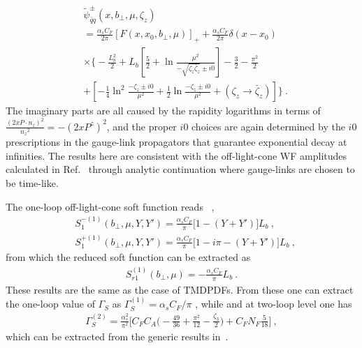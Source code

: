 \documentclass[twocolumn,superscriptaddress,longbibliography,10pt]{revtex4-1}
\begin{document}
\begin{align}\label{eq:quasiWF1oop}
&\widetilde \psi^{\pm}_{\bar q q}(x,b_\perp, \mu,\zeta_z) \\&
=\frac{\alpha_s C_F}{2\pi}\left[F(x,x_0,b_\perp,\mu)\right]_{+}+\frac{\alpha_s C_F}{2\pi}\delta\left(x-x_0\right)\nonumber \\
&\times \Bigg\{-\frac{L_b^2}{2}+L_b\left[\frac{5}{2}+\ln \frac{\mu^2}{-\sqrt{\zeta_z \bar \zeta_z} \pm i0}\right]-\frac{3}{2}-\frac{\pi^2}{2} \nonumber \\
& +\left[-\frac{1}{4}\ln^2\frac{-\zeta_z\pm i0}{\mu^2}+\frac{1}{2}\ln \frac{-\zeta_z\pm i0}{\mu^2}+(\zeta_z \rightarrow \bar \zeta_z)\right]\Bigg\}\ . \nonumber
\end{align}
The imaginary parts are all caused by the rapidity logarithms in terms of $\frac{(2xP\cdot {n_z})^2}{{n_z}^2}=-(2xP^z)^2$, and the proper $i0$ choices are again determined by the $i0$ prescriptions in the gauge-link propagators that guarantee exponential decay at infinities. The results here are consistent with the off-light-cone WF amplitudes calculated in Ref.~\cite{Ma:2006dp} through analytic continuation where gauge-links are chosen to be time-like.

The one-loop off-light-cone soft function reads ~\cite{Ebert:2019okf},
\begin{align}
&S^{-(1)}_{1}(b_\perp,\mu,Y,Y')=\frac{\alpha_sC_F}{\pi}\big[1-(Y+Y')\big]L_b \ , \\
&S^{+(1)}_{1}(b_\perp,\mu,Y,Y')=\frac{\alpha_sC_F}{\pi}\big[1-i\pi-(Y+Y')\big]L_b \ ,
\end{align}
from which the reduced soft function can be extracted as
\begin{align}
    S^{(1)}_{r1}(b_\perp,\mu)=-\frac{\alpha_sC_F}{\pi}L_b \ .
\end{align}
These results are the same as the case of TMDPDFs.  From these one can extract the one-loop value of $\Gamma_S$ as $\Gamma_S^{(1)}=\alpha_s C_F/\pi$ , while and at two-loop level one has
\begin{align}
\Gamma_S^{(2)}=\frac{\alpha_s^2}{\pi^2}\Big[C_FC_A\big(-\frac{49}{36}+\frac{\pi^2}{12}-\frac{\zeta_3}{2}\big)+C_FN_F\frac{5}{18}\Big] \ ,
\end{align}
which can be extracted from the generic results in~\cite{Grozin:2015kna}.
\end{document}

